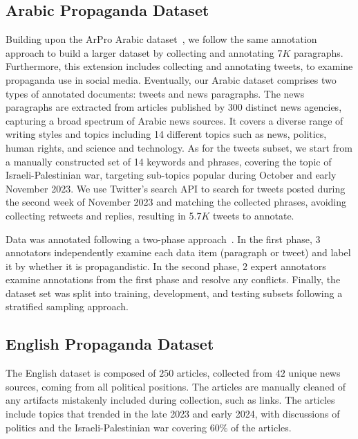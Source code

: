 \subsection{Arabic Propaganda Dataset}
Building upon the ArPro Arabic dataset~\cite{hasanain2024can}, we follow the same annotation approach to build a larger dataset by collecting and annotating 7$K$ paragraphs. %
 Furthermore, this extension includes collecting and annotating tweets, to examine propaganda use in social media. Eventually, our Arabic dataset comprises two types of annotated documents: tweets and news paragraphs. The news paragraphs are extracted from articles published by 300 distinct news agencies, capturing a broad spectrum of Arabic news sources. It covers a diverse range of writing styles and topics including 14 different topics such as  news,  politics, human rights, and science and technology.
As for the tweets subset, we start from a manually constructed set of 14 keywords and phrases, covering the topic of Israeli-Palestinian war, targeting sub-topics popular during October and early November 2023. We use Twitter's search API to search for tweets posted during the second week of November 2023 and matching the collected phrases, avoiding collecting retweets and replies, resulting in 5.7$K$ tweets to annotate. 

Data was annotated following a two-phase approach~\cite{hasanain2024can}. In the first phase, $3$ annotators independently examine each data item (paragraph or tweet) and label it by whether it is propagandistic. In the second phase, $2$ expert annotators examine annotations from the first phase and resolve any conflicts. Finally, the dataset set was split into training, development, and testing subsets following a stratified sampling approach. 


\subsection{English Propaganda Dataset}

The English dataset is composed of $250$ articles, collected from $42$ unique news sources, coming from all political positions. The articles are manually cleaned of any artifacts mistakenly included during collection, such as links. The articles include topics that trended in the late 2023 and early 2024, with discussions of politics and the Israeli-Palestinian war covering $60\%$ of the articles.

